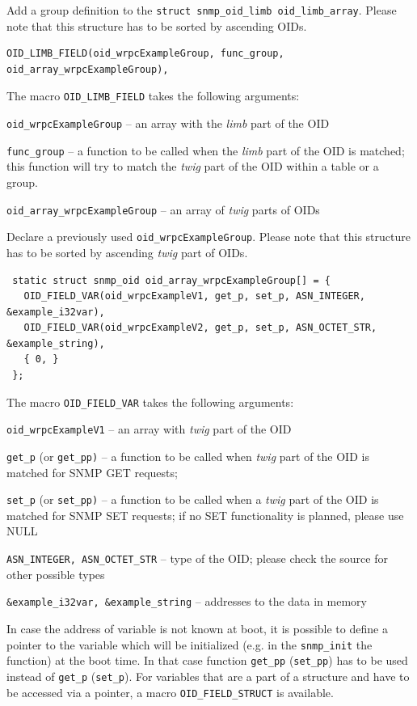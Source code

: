 \documentclass[a4paper, 12pt]{article}
\begin{document}
\begin{itemize*}
\item Add a group definition to the \texttt{struct snmp\_oid\_limb oid\_limb\_array}.
      Please note that this structure has to be sorted by ascending OIDs.
\begin{lstlisting}
OID_LIMB_FIELD(oid_wrpcExampleGroup, func_group, oid_array_wrpcExampleGroup),
\end{lstlisting}
The macro \texttt{OID\_LIMB\_FIELD} takes the following arguments:
\begin{itemize*}
   \item \texttt{oid\_wrpcExampleGroup} -- an array with the \textit{limb} part of the
         OID
   \item \texttt{func\_group} -- a function to be called when the \textit{limb} part of
         the OID is matched; this function will try to match the \textit{twig} part
         of the OID within a table or a group.
   \item \texttt{oid\_array\_wrpcExampleGroup} -- an array of \textit{twig} parts of OIDs
\end{itemize*}
\item Declare a previously used \texttt{oid\_wrpcExampleGroup}. Please note that
      this structure has to be sorted by ascending \textit{twig} part of OIDs.
\begin{lstlisting}
 static struct snmp_oid oid_array_wrpcExampleGroup[] = {
   OID_FIELD_VAR(oid_wrpcExampleV1, get_p, set_p, ASN_INTEGER,   &example_i32var),
   OID_FIELD_VAR(oid_wrpcExampleV2, get_p, set_p, ASN_OCTET_STR, &example_string),
   { 0, }
 };
\end{lstlisting}
The macro \texttt{OID\_FIELD\_VAR} takes the following arguments:
\begin{itemize*}
   \item \texttt{oid\_wrpcExampleV1} -- an array with \textit{twig} part of the OID
   \item \texttt{get\_p} (or \texttt{get\_pp)} -- a function to be called when \textit{twig}
         part of the OID is matched for SNMP GET requests;
   \item \texttt{set\_p} (or \texttt{set\_pp)} -- a function to be called when a \textit{twig}
         part of the OID is matched for SNMP SET requests; if no SET
         functionality is planned, please use NULL
   \item \texttt{ASN\_INTEGER, ASN\_OCTET\_STR} -- type of the OID; please
         check the source for other possible types
   \item \texttt{\&example\_i32var, \&example\_string} -- addresses to the data in
         memory
\end{itemize*}
In case the address of variable is not known at boot, it is possible to define
a pointer to the variable which will be initialized (e.g. in the \texttt{snmp\_init}
the function) at the boot time. In that case function \texttt{get\_pp} (\texttt{set\_pp}) has
to be used instead of \texttt{get\_p} (\texttt{set\_p}). For variables that are a part of
a structure and have to be accessed via a pointer, a macro \texttt{OID\_FIELD\_STRUCT}
is available.


\end{itemize*}
\end{document}
